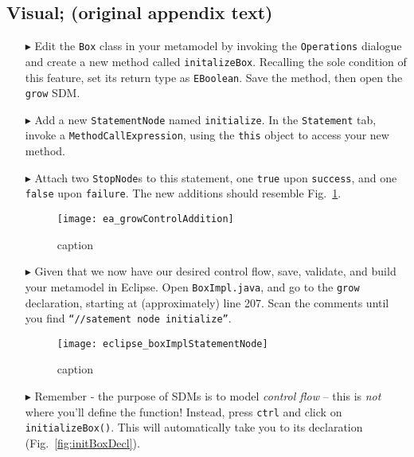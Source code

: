 \clearpage
\hypertarget{conBran vis}{}
\subsection{Visual; (original appendix text)}
\visHeader

\begin{itemize}
  

\item[$\blacktriangleright$] Edit the \texttt{Box} class in your metamodel by invoking the \texttt{Operations} dialogue and create a new method called
\texttt{initalizeBox}. Recalling the sole condition of this feature, set its return type as \texttt{EBoolean}. Save the method, then open the \texttt{grow} SDM.

\item[$\blacktriangleright$] Add a new \texttt{StatementNode} named \texttt{initialize}. In the \texttt{Statement} tab, invoke a \texttt{MethodCallExpression},
using the \texttt{this} object to access your new method.

\item[$\blacktriangleright$] Attach two \texttt{StopNode}s to this statement, one \texttt{true} upon \texttt{success}, and one \texttt{false} upon
\texttt{failure}. The new additions should resemble Fig.~\ref{fig:newGrowControl}.

\begin{figure}[htp]
\begin{center}
  \texttt{[image: ea\_growControlAddition]}
  \caption{caption}
  \label{fig:newGrowControl}
\end{center}
\end{figure}


\item[$\blacktriangleright$] Given that we now have our desired control flow, save, validate, and build your metamodel in Eclipse. Open \texttt{BoxImpl.java},
and go to the \texttt{grow} declaration, starting at (approximately) line 207. Scan the comments until you find \texttt{``//satement node initialize''}.

\begin{figure}[htp]
\begin{center}
  \texttt{[image: eclipse\_boxImplStatementNode]}
  \caption{caption}
  \label{fig:initBoxImpl}
\end{center}
\end{figure}

\item[$\blacktriangleright$] Remember - the purpose of SDMs is to model \emph{control flow} -- this is \emph{not} where you'll define the function! Instead,
press \texttt{ctrl} and click on \texttt{initializeBox()}. This will automatically take you to its declaration (Fig.~\ref{fig:initBoxDecl}).


\end{itemize}

